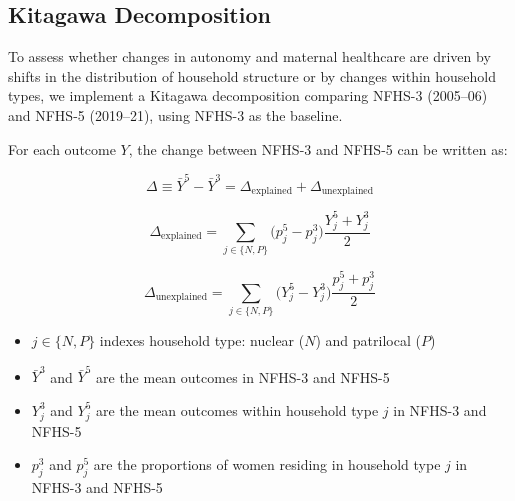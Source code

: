 \documentclass[12pt]{article}
\begin{document}
\subsection*{Kitagawa Decomposition}

To assess whether changes in autonomy and maternal healthcare are driven by shifts in the distribution of household structure or by changes within household types, we implement a Kitagawa decomposition \citep{kitagawa1955components} comparing NFHS-3 (2005--06) and NFHS-5 (2019--21), using NFHS-3 as the baseline.

For each outcome $Y$, the change between NFHS-3 and NFHS-5 can be written as:

\begin{equation}
\Delta \equiv \bar Y^{5} - \bar Y^{3}
= \Delta_{\text{explained}} + \Delta_{\text{unexplained}}
\end{equation}

\begin{equation}
\Delta_{\text{explained}} =
\sum_{j \in \{N,P\}} \big(p_j^{5} - p_j^{3}\big)\frac{Y_j^{5} + Y_j^{3}}{2}
\end{equation}

\begin{equation}
\Delta_{\text{unexplained}} =
\sum_{j \in \{N,P\}} \big(Y_j^{5} - Y_j^{3}\big)\frac{p_j^{5} + p_j^{3}}{2}
\end{equation}

\begin{itemize}
    \item $j \in \{N,P\}$ indexes household type: nuclear ($N$) and patrilocal ($P$)
    \item $\bar Y^{3}$ and $\bar Y^{5}$ are the mean outcomes in NFHS-3 and NFHS-5
    \item $Y_j^{3}$ and $Y_j^{5}$ are the mean outcomes within household type $j$ in NFHS-3 and NFHS-5
    \item $p_j^{3}$ and $p_j^{5}$ are the proportions of women residing in household type $j$ in NFHS-3 and NFHS-5
\end{itemize}

\setcounter{section}{-1}
\renewcommand{\thesection}{S.\arabic{section}}
\renewcommand{\thesubsection}{S.\arabic{section}.\arabic{subsection}}

\setcounter{table}{0}
\renewcommand{\thetable}{A\arabic{table}}
\setcounter{figure}{0}
\renewcommand{\thefigure}{A\arabic{figure}}
\end{document}
